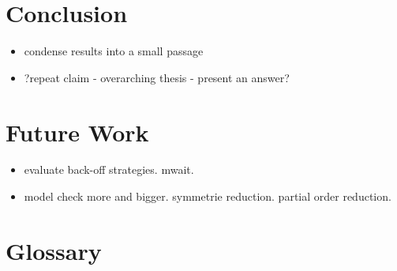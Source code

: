 \documentclass[a4paper, 10pt]{article}
\begin{document}
\section{Conclusion}
\begin{itemize}
	\item condense results into a small passage
	\item ?repeat claim - overarching thesis - present an answer?
\end{itemize}

\section{Future Work}
\begin{itemize}
	\item evaluate back-off strategies. mwait.
	\item model check more and bigger. symmetrie reduction. partial order reduction.
\end{itemize}


\pagebreak

\appendix
\section{Glossary}

\listoffigures

\listoftables

\nocite{*} %

{}
\end{document}
